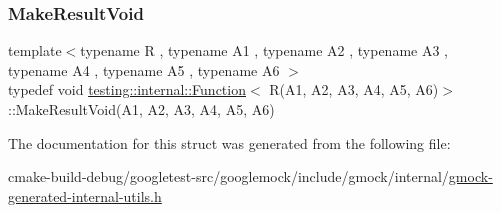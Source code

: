 \subsubsection{\texorpdfstring{MakeResultVoid}{MakeResultVoid}}
{\footnotesize\ttfamily template$<$typename R , typename A1 , typename A2 , typename A3 , typename A4 , typename A5 , typename A6 $>$ \\
typedef void \mbox{\hyperlink{structtesting_1_1internal_1_1Function}{testing\+::internal\+::\+Function}}$<$ R(A1, A2, A3, A4, A5, A6)$>$\+::Make\+Result\+Void(A1, A2, A3, A4, A5, A6)}



The documentation for this struct was generated from the following file\+:\begin{DoxyCompactItemize}
\item 
cmake-\/build-\/debug/googletest-\/src/googlemock/include/gmock/internal/\mbox{\hyperlink{gmock-generated-internal-utils_8h}{gmock-\/generated-\/internal-\/utils.\+h}}\end{DoxyCompactItemize}
